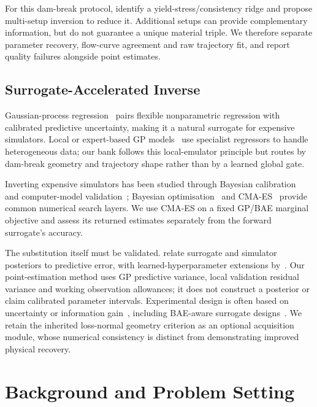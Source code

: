 For this dam-break protocol, \citet{hamamichi2023nonnewtonian}
identify a yield-stress/consistency ridge and propose multi-setup
inversion to reduce it. Additional setups can provide complementary
information, but do not guarantee a unique material triple. We therefore
separate parameter recovery, flow-curve agreement and raw trajectory
fit, and report quality failures alongside point estimates.


\subsection{Surrogate-Accelerated Inverse}

Gaussian-process regression~\cite{rasmussen2006gaussian} pairs
flexible nonparametric regression with calibrated predictive
uncertainty, making it a natural surrogate for expensive simulators.
Local or expert-based GP models~\cite{jordan1994hierarchical,
tresp2001mixtures,liu2018generalized} use specialist regressors to
handle heterogeneous data; our bank follows this local-emulator
principle but routes by dam-break geometry and trajectory shape rather
than by a learned global gate.

Inverting expensive simulators has been studied through Bayesian
calibration~\cite{kennedy2001bayesian} and computer-model
validation~\cite{bayarri2007framework}; Bayesian
optimisation~\cite{snoek2012practical,shahriari2016taking} and
CMA-ES~\cite{hansen2016cma} provide common numerical search layers.
We use CMA-ES on a fixed GP/BAE marginal objective and assess its
returned estimates separately from the forward surrogate's accuracy.

The substitution itself must be validated.
\citet{stuart2018posterior} relate surrogate and simulator posteriors
to predictive error, with learned-hyperparameter extensions
by~\citet{teckentrup2020convergence}. Our point-estimation method uses
GP predictive variance, local validation residual variance and working
observation allowances; it does not construct a posterior or claim
calibrated parameter intervals. Experimental design is often based on
uncertainty or information gain~\cite{chaloner1995bayesian}, including
BAE-aware surrogate designs~\cite{koval2025nonintrusive}.
We retain the inherited loss-normal geometry criterion as an optional
acquisition module, whose numerical consistency is distinct from
demonstrating improved physical recovery.


\section{Background and Problem Setting}
\label{sec:background}

